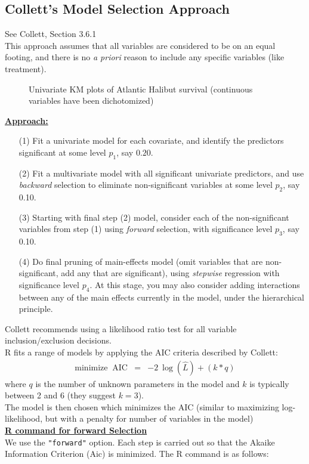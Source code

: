 \documentclass[11pt]{book}
\begin{document}
\subsection{Collett's Model Selection Approach}
{See Collett, Section 3.6.1}\\[2ex]

This approach assumes that all variables are considered to be on an
equal footing, and there is no {\em a priori} reason to include any
specific variables (like treatment).
\begin{figure}[h!]
\centerline{ \hspace{0.25in}
}

\centerline{ \hspace{0.25in}
}

\centerline{}
\caption{Univariate KM plots of Atlantic Halibut survival
(continuous variables have been dichotomized)}
\end{figure}
\clearpage
\noindent
\underline{\bf Approach:}
\begin{itemize}
\small
\item[(1)] Fit a univariate model for each covariate, and identify the
predictors significant at some level $p_1$, say $0.20$.
\item[(2)] Fit a multivariate model with all significant univariate
predictors, and use {\em backward} selection to eliminate non-significant
variables at some level $p_2$, say 0.10.
\item[(3)] Starting with final step (2) model, consider each of
the non-significant variables from step (1) using
{\em forward} selection, with significance level $p_3$, say 0.10.
\item[(4)] Do final pruning of main-effects model (omit variables that
are non-significant, add any that are significant), using {\em stepwise}
regression with significance level $p_4$.  At this stage, you may also
consider adding interactions between any of the main effects currently
in the model, under the hierarchical principle.
\end{itemize}
Collett recommends using a likelihood ratio test for all variable
inclusion/exclusion decisions.
\\[2ex]
R fits a range of models by applying the AIC criteria described by Collett:
\begin{eqnarray*}
\mbox{minimize } ~\mbox{AIC} & = & -2 ~\log(\hat{L}) + (k*q )
\end{eqnarray*}
where $q$ is the number of unknown parameters in the model and $k$ is
typically between 2 and 6 (they suggest $k=3$).
\\[2ex]
The model is then chosen which minimizes the AIC
(similar to maximizing log-likelihood, but with a penalty for
number of variables in the model)
\\[2ex]
\underline{\bf R command for forward Selection}\\[2ex]
We use the {\tt "forward"} option. Each step is carried out so that the Akaike Information Criterion (Aic) is minimized.  The R command is as follows:
\end{document}

